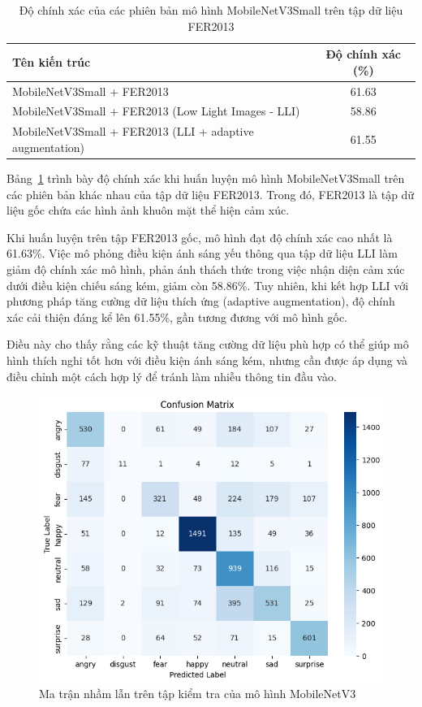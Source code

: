 \begin{table}[H]
\centering
\caption{Độ chính xác của các phiên bản mô hình MobileNetV3Small trên tập dữ liệu FER2013}
\begin{tabular}{@{}lc@{}}
\toprule
\textbf{Tên kiến trúc} & \textbf{Độ chính xác (\%)} \\ \midrule
MobileNetV3Small + FER2013 & 61.63 \\
MobileNetV3Small + FER2013 (Low Light Images - LLI) & 58.86 \\
MobileNetV3Small + FER2013 (LLI + adaptive augmentation) & 61.55 \\ \bottomrule
\end{tabular}
\label{tab:training-results}
\end{table}

Bảng~\ref{tab:training-results} trình bày độ chính xác khi huấn luyện mô hình MobileNetV3Small trên các phiên bản khác nhau của tập dữ liệu FER2013. Trong đó, FER2013 là tập dữ liệu gốc chứa các hình ảnh khuôn mặt thể hiện cảm xúc. 

Khi huấn luyện trên tập FER2013 gốc, mô hình đạt độ chính xác cao nhất là 61.63\%. Việc mô phỏng điều kiện ánh sáng yếu thông qua tập dữ liệu LLI làm giảm độ chính xác mô hình, phản ánh thách thức trong việc nhận diện cảm xúc dưới điều kiện chiếu sáng kém, giảm còn 58.86\%. Tuy nhiên, khi kết hợp LLI với phương pháp tăng cường dữ liệu thích ứng (adaptive augmentation), độ chính xác cải thiện đáng kể lên 61.55\%, gần tương đương với mô hình gốc. 

Điều này cho thấy rằng các kỹ thuật tăng cường dữ liệu phù hợp có thể giúp mô hình thích nghi tốt hơn với điều kiện ánh sáng kém, nhưng cần được áp dụng và điều chỉnh một cách hợp lý để tránh làm nhiễu thông tin đầu vào.


\begin{figure}[H]
\centering
\includegraphics[width=1\textwidth]{img/confusionMatrixMobilenetV3.png}
\caption{Ma trận nhầm lẫn trên tập kiểm tra của mô hình MobileNetV3}
\label{fig:confusion-mobilenetv3}
\end{figure}

